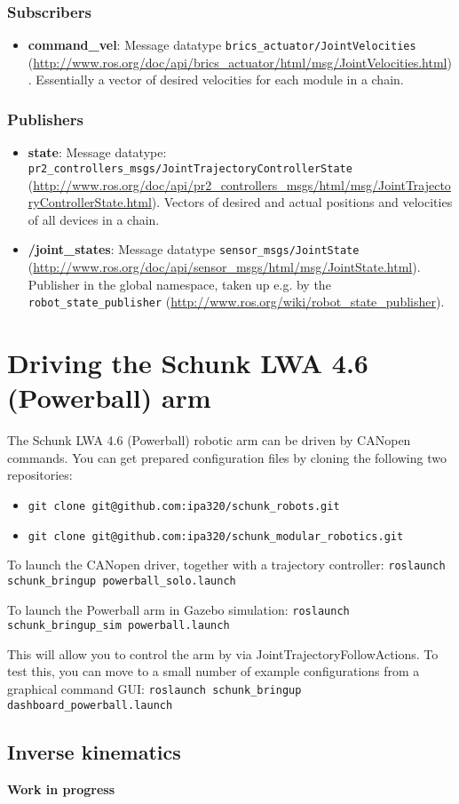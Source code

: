 \subsubsection{Subscribers}

\begin{itemize}
\item {\bf command\_vel}: Message datatype \texttt{brics\_actuator/JointVelocities} (\url{http://www.ros.org/doc/api/brics_actuator/html/msg/JointVelocities.html}). Essentially a vector of desired velocities for each module in a chain.
\end{itemize}

\subsubsection{Publishers}

\begin{itemize}
\item {\bf state}: Message datatype: \texttt{pr2\_controllers\_msgs/JointTrajectoryControllerState} (\url{http://www.ros.org/doc/api/pr2_controllers_msgs/html/msg/JointTrajectoryControllerState.html}). Vectors of desired and actual positions and velocities of all devices in a chain.
\item {\bf /joint\_states}: Message datatype \texttt{sensor\_msgs/JointState} (\url{http://www.ros.org/doc/api/sensor_msgs/html/msg/JointState.html}). Publisher in the global namespace, taken up e.g. by the \texttt{robot\_state\_publisher} (\url{http://www.ros.org/wiki/robot_state_publisher}).
\end{itemize}

\section{Driving the Schunk LWA 4.6 (Powerball) arm}

The Schunk LWA 4.6 (Powerball) robotic arm can be driven by CANopen commands. You can get prepared configuration files by cloning the following two repositories:
\begin{itemize}
\item \texttt{git clone git@github.com:ipa320/schunk\_robots.git}
\item \texttt{git clone git@github.com:ipa320/schunk\_modular\_robotics.git}
\end{itemize}

To launch the CANopen driver, together with a trajectory controller:
\texttt{roslaunch schunk\_bringup powerball\_solo.launch}

To launch the Powerball arm in Gazebo simulation:
\texttt{roslaunch schunk\_bringup\_sim powerball.launch}

This will allow you to control the arm by via JointTrajectoryFollowActions. To test this, you can move to a small number of example configurations from a graphical command GUI:
\texttt{roslaunch schunk\_bringup dashboard\_powerball.launch}

\subsection{Inverse kinematics}

{\bf Work in progress}
